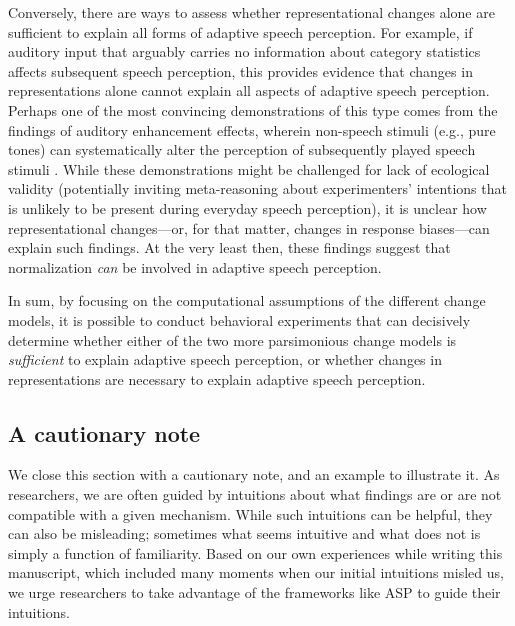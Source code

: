 \documentclass[
  11pt,
  man,floatsintext]{apa6}
\begin{document}
Conversely, there are ways to assess whether representational changes alone are sufficient to explain all forms of adaptive speech perception. For example, if auditory input that arguably carries no information about category statistics affects subsequent speech perception, this provides evidence that changes in representations alone cannot explain all aspects of adaptive speech perception. Perhaps one of the most convincing demonstrations of this type comes from the findings of auditory enhancement effects, wherein non-speech stimuli (e.g., pure tones) can systematically alter the perception of subsequently played speech stimuli \autocites{chodroff-wilson2020,holt2001,holt2005,holt2006,huang-holt2011}[for review, see also][]{weatherholtz-jaeger2016}. While these demonstrations might be challenged for lack of ecological validity (potentially inviting meta-reasoning about experimenters' intentions that is unlikely to be present during everyday speech perception), it is unclear how representational changes---or, for that matter, changes in response biases---can explain such findings. At the very least then, these findings suggest that normalization \emph{can} be involved in adaptive speech perception.

In sum, by focusing on the computational assumptions of the different change models, it is possible to conduct behavioral experiments that can decisively determine whether either of the two more parsimonious change models is \emph{sufficient} to explain adaptive speech perception, or whether changes in representations are necessary to explain adaptive speech perception.

\hypertarget{sec:cautionary-note}{%
\subsection{A cautionary note}\label{sec:cautionary-note}}

We close this section with a cautionary note, and an example to illustrate it. As researchers, we are often guided by intuitions about what findings are or are not compatible with a given mechanism. While such intuitions can be helpful, they can also be misleading; sometimes what seems intuitive and what does not is simply a function of familiarity. Based on our own experiences while writing this manuscript, which included many moments when our initial intuitions misled us, we urge researchers to take advantage of the frameworks like ASP to guide their intuitions.
\end{document}
